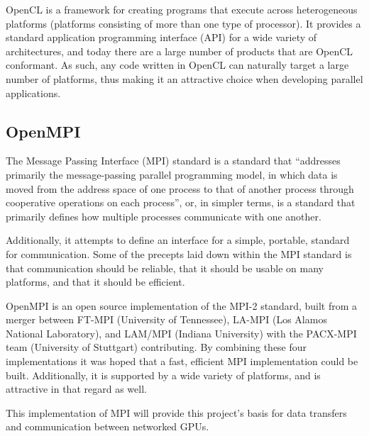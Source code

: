 \documentclass[../thesis.tex]{subfiles}
\begin{document}
        OpenCL is a framework for creating programs that execute across heterogeneous platforms (platforms consisting of more than one type of processor). It provides a standard application programming interface (API) for a wide variety of architectures, and today there are a large number of products that are OpenCL conformant\cite{khronosconformance}. As such, any code written in OpenCL can naturally target a large number of platforms, thus making it an attractive choice when developing parallel applications.  

    \subsection{OpenMPI} %
    \label{sub:openmpi}
        The Message Passing Interface (MPI) standard is a standard that ``addresses primarily the message-passing parallel programming model, in which data is moved from the address space of one process to that of another process through cooperative operations on each process''\cite{MPI-2.2}, or, in simpler terms, is a standard that primarily defines how multiple processes communicate with one another. 

        Additionally, it attempts to define an interface for a simple, portable, standard for communication. Some of the precepts laid down within the MPI standard is that communication should be reliable, that it should be usable on many platforms, and that it should be efficient.


        OpenMPI is an open source implementation of the MPI-2 standard, built from a merger between FT-MPI (University of Tennessee), LA-MPI (Los Alamos National Laboratory), and LAM/MPI (Indiana University) with the PACX-MPI team (University of Stuttgart) contributing. By combining these four implementations it was hoped that a fast, efficient MPI implementation could be built.\cite{openmpiwebsite} Additionally, it is supported by a wide variety of platforms, and is attractive in that regard as well.

        This implementation of MPI will provide this project's basis for data transfers and communication between networked GPUs.
    
\end{document}
